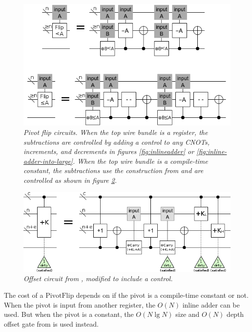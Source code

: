 \documentclass[twocolumn]{article}
\begin{document}
\begin{figure}
  \centering
  \includegraphics[width=\linewidth]{assets/pivot-flip.png}
  \caption{\em Pivot flip circuits.
  When the top wire bundle is a register, the subtractions are controlled by adding a control to any CNOTs, increments, and decrements in figures \ref{fig:inlineadder} or \ref{fig:inline-adder-into-large}.
  When the top wire bundle is a compile-time constant, the subtractions use the construction from \cite{haner2016} and are controlled as shown in figure \ref{fig:controlled-offset}.}
  \label{fig:const-pivot-flip}
\end{figure}

\begin{figure}
  \centering
  \includegraphics[width=\linewidth]{assets/controlled-offset.png}
  \caption{\em Offset circuit from \cite{haner2016}, modified to include a control.}
  \label{fig:controlled-offset}
\end{figure}

The cost of a $\text{PivotFlip}$ depends on if the pivot is a compile-time constant or not.
When the pivot is input from another register, the $O(N)$ inline adder can be used.
But when the pivot is a constant, the $O(N \lg N)$ size and $O(N)$ depth offset gate from \cite{haner2016} is used instead.
\end{document}
